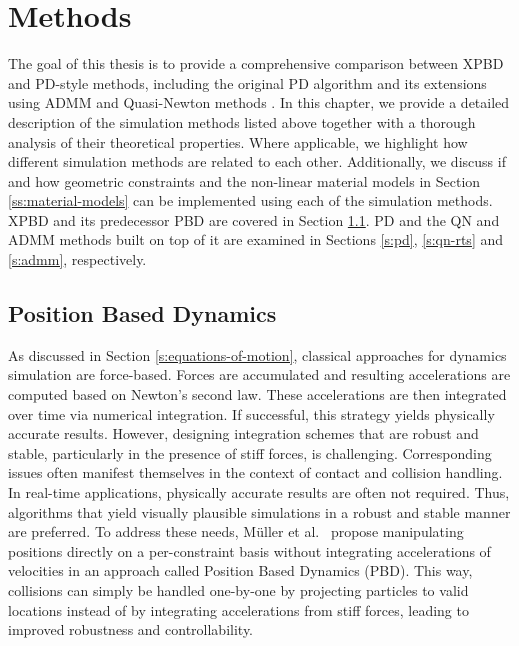 \chapter{Methods}\label{ch:method}

The goal of this thesis is to provide a comprehensive comparison between XPBD \cite{macklin2016} and PD-style methods, including the original 
PD algorithm \cite{bouaziz2014} and its extensions using ADMM \cite{overby2017} and Quasi-Newton methods \cite{liu2017}. 
In this chapter, we provide a detailed description of the simulation methods listed above together with a 
thorough analysis of their theoretical properties. Where applicable, we highlight how different simulation methods are related to each other. 
Additionally, we discuss if and how geometric constraints and the non-linear material models in Section \ref{ss:material-models} can be 
implemented using each of the simulation methods. XPBD and its predecessor PBD are covered in Section \ref{s:pbd}. PD and the QN and ADMM 
methods built on top of it are examined in Sections \ref{s:pd}, \ref{s:qn-rts} and \ref{s:admm}, respectively.

\section{Position Based Dynamics}\label{s:pbd}
As discussed in Section \ref{s:equations-of-motion}, classical approaches for dynamics simulation are force-based. Forces are accumulated and 
resulting accelerations are computed based on Newton's second law. These accelerations are then integrated over time via numerical integration. 
If successful, this strategy yields physically accurate results. However, designing integration schemes that are robust and stable,
particularly in the presence of stiff forces, is challenging. Corresponding issues often manifest themselves in the context of contact and collision 
handling. In real-time applications, physically accurate results are often not required. Thus, algorithms that yield visually
plausible simulations in a robust and stable manner are preferred. To address these needs, Müller et al.\ \cite{mueller2006} propose manipulating
positions directly on a per-constraint basis without integrating accelerations of velocities in an approach called Position Based Dynamics (PBD).
This way, collisions can simply be handled one-by-one by projecting particles to valid locations instead of by integrating accelerations from 
stiff forces, leading to improved robustness and controllability. 

